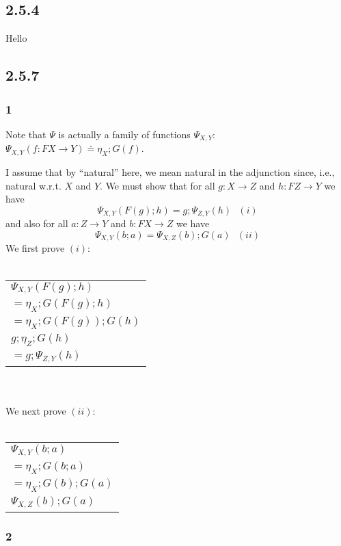 \documentclass{article}
\begin{document}
\subsection*{2.5.4}

Hello

\subsection*{2.5.7}

\subsubsection*{1}

Note that $\Psi$ is actually a family of functions $\Psi_{X,Y}$: 
$\Psi_{X,Y}(f : FX \to Y) \doteq \eta_X;G(f)$.

I assume that by ``natural'' here, we mean natural in the adjunction since, i.e., natural w.r.t. $X$ and $Y$.
We must show that for all $g : X \to Z$ and $h : FZ \to Y$ we have
$$\Psi_{X,Y}(F(g);h) = g;\Psi_{Z,Y}(h)~~~(i)$$
and also for all $a : Z \to Y$ and $b : FX \to Z$ we have
$$\Psi_{X,Y}(b;a) = \Psi_{X,Z}(b);G(a)~~~(ii)$$
We first prove $(i)$:\\~\\
\begin{tabular}{l}
$\Psi_{X,Y}(F(g);h)$ \\
$= \eta_X;G(F(g);h)$ \\
$= \eta_X;G(F(g));G(h)$ \\
$g;\eta_Z;G(h)$ \\
$= g;\Psi_{Z,Y}(h)$\\
\end{tabular}\\~\\
We next prove $(ii)$:\\~\\
\begin{tabular}{l}
$\Psi_{X,Y}(b;a)$ \\
$= \eta_X;G(b;a)$ \\
$= \eta_X;G(b);G(a)$ \\
$\Psi_{X,Z}(b);G(a)$
\end{tabular}

\subsubsection*{2}
\end{document}
